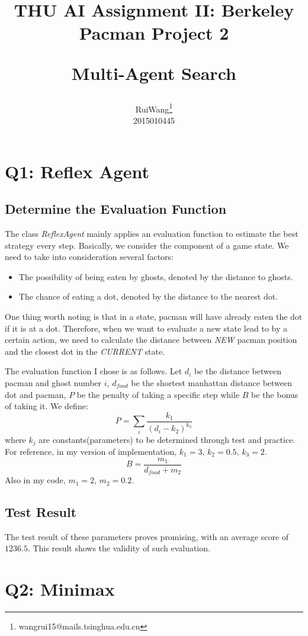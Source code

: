 \documentclass{article}
\title{THU AI Assignment II: Berkeley Pacman Project 2 \\ [2ex] \begin{large} Multi-Agent Search \end{large} }
\author{\large Rui\hspace{0.2cm}Wang\footnote{wangrui15@mails.tsinghua.edu.cn} \\ 2015010445}
\date{}
\begin{document}
\maketitle

\section{Q1: Reflex Agent}
  \subsection{Determine the Evaluation Function}
  The class \textit{ReflexAgent} mainly applies an evaluation function to estimate the best strategy every step. Basically, we consider the component of a game state. We need to take into consideration several factors:
  \begin{itemize}
    \item The possibility of being eaten by ghosts, denoted by the distance to ghosts.
    \item The chance of eating a dot, denoted by the distance to the nearest dot.
  \end{itemize}\par
  One thing worth noting is that in a state, pacman will have already eaten the dot if it is at a dot. Therefore, when we want to evaluate a new state lead to by a certain action, we need to calculate the distance between \emph{NEW} pacman position and the closest dot in the \emph{CURRENT} state.\par
  The evaluation function I chose is as follows. Let $d_i$ be the distance between pacman and ghost number $i$, $d_{food}$ be the shortest manhattan distance between dot and pacman, $P$ be the penalty of taking a specific step while $B$ be the bonus of taking it. We define:
  \[ P = \sum_{i} \frac{k_1}{(d_i - k_2)^{k_3}} \] where $k_j$ are constants(parameters) to be determined through test and practice. For reference, in my version of implementation, $k_1 = 3$, $k_2 = 0.5$, $k_3 = 2$.
  \[ B = \frac{m_1}{d_{food} + m_2}\] Also in my code, $m_1 = 2$, $m_2 = 0.2$.\par
  \subsection{Test Result}
  The test result of these parameters proves promising, with an average score of $1236.5$. This result shows the validity of such evaluation.
  
\section{Q2: Minimax}
\end{document}
